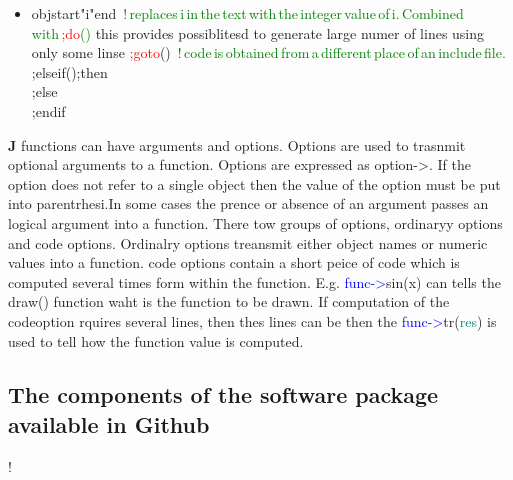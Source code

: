 \begin{itemize}
\item objstart"i"end \,\textcolor{green}{!\,replaces\,i\,in\,the\,text\,with\,the\,integer\,value\,of\,i.\,Combined\,with\,\textcolor{Red}{;do}()}
this provides possiblitesd to generate large numer of lines using only some linse
\textcolor{Red}{;goto}() \,\textcolor{green}{!\,code\,is\,obtained\,from\,a\,different\,place\,of\,an\,include\,file.}
;elseif();then \\
;else \\
;endif
\end{itemize}
\textbf{J} functions can have arguments and options. Options are used to trasnmit optional arguments
to a function. Options are expressed as option->. If the option does not refer to a single object then
the value of the option must be put into parentrhesi.In some cases the prence or absence of an argument passes an logical
argument into a function. There tow groups of options, ordinaryy options and code options.
Ordinalry options treansmit either object names or numeric values into a function.
code options contain a short peice of code which is computed several times form within the function.
E.g. \textcolor{blue}{func->}\textcolor{VioletRed}{sin}(x) can tells the \textcolor{VioletRed}{draw}() function waht is the function to be drawn. If
computation of the codeoption rquires several lines, then thes lines can be
then the \textcolor{blue}{func->}tr(\textcolor{teal}{res}) is used to tell how the function value is computed.
\subsection{The components of the software package available in Github}
\label{pack}
!
